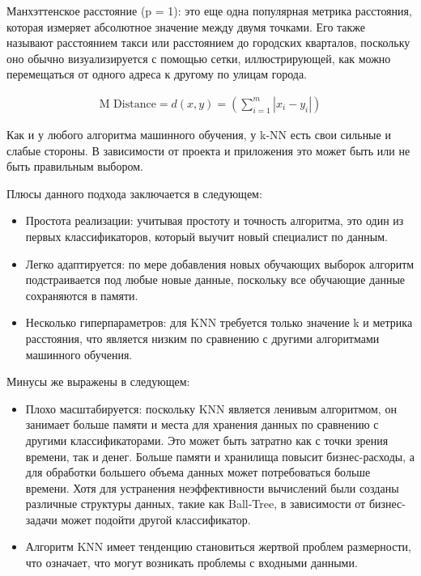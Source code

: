 Манхэттенское расстояние (p = 1): это еще одна популярная метрика расстояния,
которая измеряет абсолютное значение между двумя точками. 
Его также называют расстоянием такси или расстоянием до городских кварталов, 
поскольку оно обычно визуализируется с помощью сетки, иллюстрирующей, 
как можно перемещаться от одного адреса к другому по улицам города.

\begin{equation}
  \begin{gathered}
    \text{M Distance} = d(x, y) = (\sum_{i=1}^m \left | x_i - y_i \right | )
  \end{gathered}
  \label{eq:speach_formula_21}
\end{equation}

Как и у любого алгоритма машинного обучения, у k-NN есть свои сильные и слабые стороны. 
В зависимости от проекта и приложения это может быть или не быть правильным выбором.

Плюсы данного подхода заключается в следующем: 
\begin{itemize}
  \item Простота реализации: учитывая простоту и точность алгоритма, это один из первых классификаторов, который выучит новый специалист по данным.
  \item Легко адаптируется: по мере добавления новых обучающих выборок алгоритм подстраивается под любые новые данные, поскольку все обучающие данные сохраняются в памяти.
  \item Несколько гиперпараметров: для KNN требуется только значение k и метрика расстояния, что является низким по сравнению с другими алгоритмами машинного обучения.
\end{itemize}

Минусы же выражены в следующем: 

\begin{itemize}
  \item Плохо масштабируется: поскольку KNN является ленивым алгоритмом, он занимает больше памяти и места для хранения данных по сравнению с другими классификаторами. Это может быть затратно как с точки зрения времени, так и денег. Больше памяти и хранилища повысит бизнес-расходы, а для обработки большего объема данных может потребоваться больше времени. Хотя для устранения неэффективности вычислений были созданы различные структуры данных, такие как Ball-Tree, в зависимости от бизнес-задачи может подойти другой классификатор.
  \item Алгоритм KNN имеет тенденцию становиться жертвой проблем размерности, что означает, что могут возникать проблемы с входными данными.
\end{itemize}

